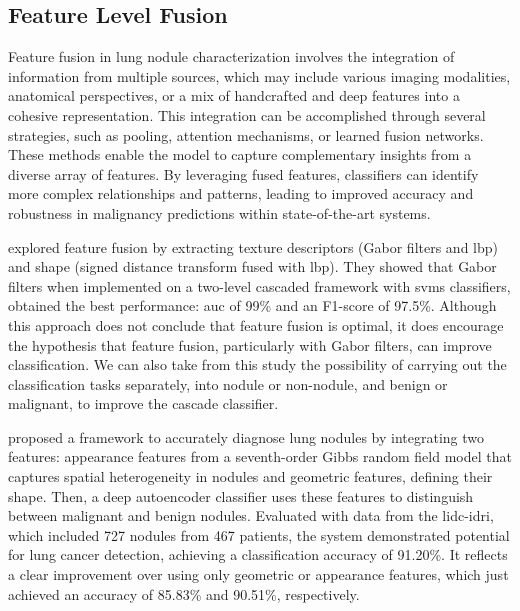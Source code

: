 \subsection{Feature Level Fusion}
Feature fusion in lung nodule characterization involves the integration of information from multiple sources, which may include various imaging modalities, anatomical perspectives, or a mix of handcrafted and deep features into a cohesive representation. This integration can be accomplished through several strategies, such as pooling, attention mechanisms, or learned fusion networks. These methods enable the model to capture complementary insights from a diverse array of features. By leveraging fused features, classifiers can identify more complex relationships and patterns, leading to improved accuracy and robustness in malignancy predictions within state-of-the-art systems. 

\textcite{farag_feature_2017} explored feature fusion by extracting texture descriptors (Gabor filters and \ac{lbp}) and shape (signed distance transform fused with \ac{lbp}). They showed that Gabor filters when implemented on a two-level cascaded framework with \acp{svm} classifiers, obtained the best performance: \ac{auc} of 99\% and an F1-score of 97.5\%. Although this approach does not conclude that feature fusion is optimal, it does encourage the hypothesis that feature fusion, particularly with Gabor filters, can improve classification. We can also take from this study the possibility of carrying out the classification tasks separately, into nodule or non-nodule, and benign or malignant, to improve the cascade classifier.

\textcite{shaffie_generalized_2018} proposed a framework to accurately diagnose lung nodules by integrating two features: appearance features from a seventh-order Gibbs random field model that captures spatial heterogeneity in nodules and geometric features, defining their shape. Then, a deep autoencoder classifier uses these features to distinguish between malignant and benign nodules. Evaluated with data from the \ac{lidc-idri}, which included 727 nodules from 467 patients, the system demonstrated potential for lung cancer detection, achieving a classification accuracy of 91.20\%. It reflects a clear improvement over using only geometric or appearance features, which just achieved an accuracy of 85.83\% and 90.51\%, respectively.

